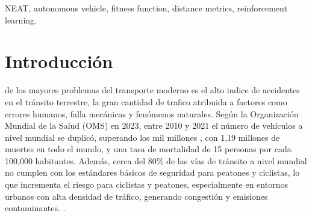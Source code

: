 \documentclass[lettersize, journal]{IEEEtran}
\begin{document}
\begin{IEEEkeywords}
NEAT, autonomous vehicle, fitness function, distance metrics, reinforcement learning.
\end{IEEEkeywords}

\section{Introducción}
 de los mayores problemas del transporte moderno es el alto indice de accidentes en el tránsito terrestre, la gran cantidad de trafico atribuida a factores como errores humanos, falla mecánicas y fenómenos naturales. Según la Organización Mundial de la Salud (OMS) en 2023, entre 2010 y 2021 el número de vehículos a nivel mundial se duplicó, superando los mil millones \cite{Accidentes}, con 1,19 millones de muertes en todo el mundo, y una tasa de mortalidad de 15 personas por cada 100,000 habitantes. Además, cerca del 80\% de las vías de tránsito a nivel mundial no cumplen con los estándares básicos de seguridad para peatones y ciclistas, lo que incrementa el riesgo para ciclistas y peatones, especialmente en entornos urbanos con alta densidad de tráfico, generando congestión y emisiones contaminantes. \cite{montezuma2008derecho, diaz2015infraestructuras}.

\end{document}
